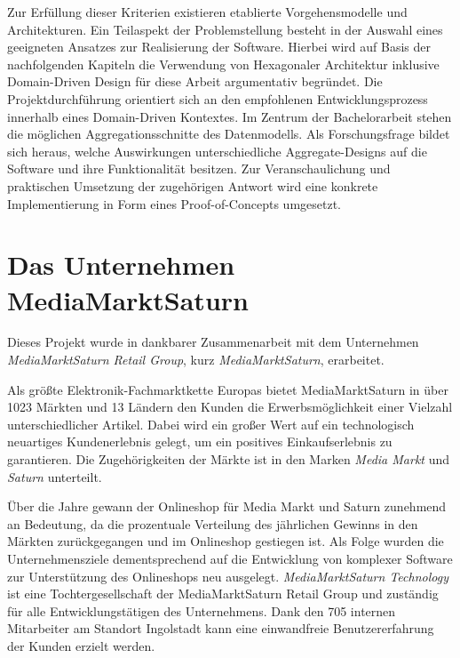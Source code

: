 Zur Erfüllung dieser Kriterien existieren etablierte Vorgehensmodelle und Architekturen. Ein Teilaspekt der Problemstellung besteht in der Auswahl eines geeigneten Ansatzes zur Realisierung der Software. Hierbei wird auf Basis der nachfolgenden Kapiteln die Verwendung von Hexagonaler Architektur inklusive Domain-Driven Design für diese Arbeit argumentativ begründet. Die Projektdurchführung orientiert sich an den empfohlenen Entwicklungsprozess innerhalb eines Domain-Driven Kontextes. Im Zentrum der Bachelorarbeit stehen die möglichen Aggregationsschnitte des Datenmodells. Als Forschungsfrage bildet sich heraus, welche Auswirkungen unterschiedliche Aggregate-Designs auf die Software und ihre Funktionalität besitzen. Zur Veranschaulichung und praktischen Umsetzung der zugehörigen Antwort wird eine konkrete Implementierung in Form eines Proof-of-Concepts umgesetzt.



\section{Das Unternehmen MediaMarktSaturn}

Dieses Projekt wurde in dankbarer Zusammenarbeit mit dem Unternehmen \emph{MediaMarktSaturn Retail Group}, kurz \emph{MediaMarktSaturn}, erarbeitet.

Als größte Elektronik-Fachmarktkette Europas bietet MediaMarktSaturn in über 1023 Märkten und 13 Ländern den Kunden die Erwerbsmöglichkeit einer Vielzahl unterschiedlicher Artikel. Dabei wird ein großer Wert auf ein technologisch neuartiges Kundenerlebnis gelegt, um ein positives Einkaufserlebnis zu garantieren. Die Zugehörigkeiten der Märkte ist in den Marken \emph{Media Markt} und \emph{Saturn} unterteilt.

Über die Jahre gewann der Onlineshop für Media Markt und Saturn zunehmend an Bedeutung, da die prozentuale Verteilung des jährlichen Gewinns in den Märkten zurückgegangen und im Onlineshop gestiegen ist. Als Folge wurden die Unternehmensziele dementsprechend auf die Entwicklung von komplexer Software zur Unterstützung des Onlineshops neu ausgelegt. \emph{MediaMarktSaturn Technology} ist eine Tochtergesellschaft der MediaMarktSaturn Retail Group und zuständig für alle Entwicklungstätigen des Unternehmens. Dank den 705 internen Mitarbeiter am Standort Ingolstadt kann eine einwandfreie Benutzererfahrung der Kunden erzielt werden. 

